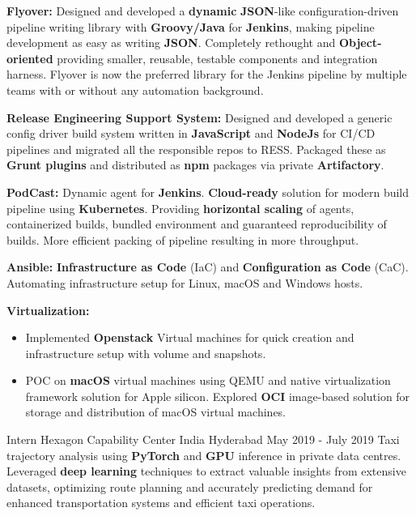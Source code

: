 \begin{cventries}
{\begin{itemize}
        \end{itemize}
        \item \textbf{Flyover:} Designed and developed a \textbf{dynamic} \textbf{JSON}-like configuration-driven pipeline writing library with \textbf{Groovy/Java} for \textbf{Jenkins}, making pipeline development as easy as writing \textbf{JSON}. Completely rethought and \textbf{Object-oriented} providing smaller, reusable, testable components and integration harness. Flyover is now the preferred library for the Jenkins pipeline by multiple teams with or without any automation background.
        \item \textbf{Release Engineering Support System:} Designed and developed a generic config driver build system written in \textbf{JavaScript} and \textbf{NodeJs} for CI/CD pipelines and migrated all the responsible repos to RESS. Packaged these as \textbf{Grunt plugins} and distributed as \textbf{npm} packages via private \textbf{Artifactory}.
        \item \textbf{PodCast:} Dynamic agent for \textbf{Jenkins}. \textbf{Cloud-ready} solution for modern build pipeline using \textbf{Kubernetes}. Providing \textbf{horizontal scaling} of agents, containerized builds, bundled environment and guaranteed reproducibility of builds. More efficient packing of pipeline resulting in more throughput.
        \item \textbf{Ansible:} \textbf{Infrastructure as Code} (IaC) and \textbf{Configuration as Code} (CaC). Automating infrastructure setup for Linux, macOS and Windows hosts.
        \item \textbf{Virtualization:}
        \begin{itemize}
            \item Implemented \textbf{Openstack} Virtual machines for quick creation and infrastructure setup with volume and snapshots.
            \item POC on \textbf{macOS} virtual machines using QEMU and native virtualization framework solution for Apple silicon. Explored \textbf{OCI} image-based solution for storage and distribution of macOS virtual machines.
        \end{itemize}
    }

\vspace{-5mm}

\cventry
    {Intern} %
    {Hexagon Capability Center India} %
    {Hyderabad} %
    {May 2019 - July 2019} %
    {
        Taxi trajectory analysis using \textbf{PyTorch} and \textbf{GPU} inference in private data centres. Leveraged \textbf{deep learning} techniques to extract valuable insights from extensive datasets, optimizing route planning and accurately predicting demand for enhanced transportation systems and efficient taxi operations.
    }

\end{cventries}

\vspace{-2mm}
